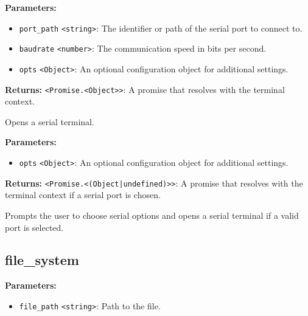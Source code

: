 \documentclass[12pt,a4paper]{article}
\begin{document}
\vspace{5mm}
\noindent {}


\noindent \textbf{Parameters:}
\begin{itemize}
  \item \texttt{port\_path} \texttt{<string>}: The identifier or path of the serial port to connect to.
  \item \texttt{baudrate} \texttt{<number>}: The communication speed in bits per second.
  \item \texttt{opts} \texttt{<Object>}: An optional configuration object for additional settings.
\end{itemize}

\noindent \textbf{Returns:} \texttt{<Promise.<Object>>}: A promise that resolves with the terminal context.

\noindent Opens a serial terminal.

\vspace{5mm}
\noindent {}


\noindent \textbf{Parameters:}
\begin{itemize}
  \item \texttt{opts} \texttt{<Object>}: An optional configuration object for additional settings.
\end{itemize}

\noindent \textbf{Returns:} \texttt{<Promise.<(Object|undefined)>>}: A promise that resolves with the terminal context if a serial port is chosen.

\noindent Prompts the user to choose serial options and opens a serial terminal if a valid port is selected.


\subsection{file\_system}
\vspace{5mm}
\noindent {}


\noindent \textbf{Parameters:}
\begin{itemize}
  \item \texttt{file\_path} \texttt{<string>}: Path to the file.
\end{itemize}
\end{document}
